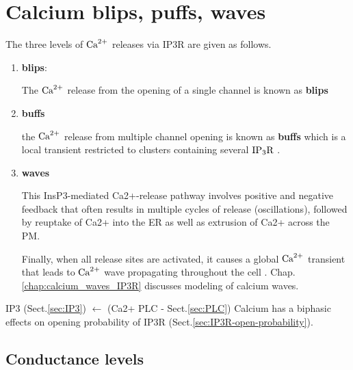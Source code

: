 


\section{Calcium blips, puffs, waves}
\label{sec:blips}
\label{sec:puff}
\label{sec:calcium-release-IP3R}

The three levels of ${\text{Ca}^{2+}}$ releases via IP3R are given as follows.
\begin{enumerate}
  
  \item {\bf blips}:

The ${\text{Ca}^{2+}}$ release from the opening of a single channel is known as {\bf blips}
\citep{parker1996eei}

  
  \item {\bf buffs}

the ${\text{Ca}^{2+}}$ release from multiple channel opening is
known as {\bf buffs} which is a local transient restricted to clusters
containing several ${\text{IP}_3\text{R}}$ \citep{parker1996cta, parker1996eei}. 
  
  \item {\bf waves}


This InsP3-mediated Ca2+-release pathway involves positive and negative feedback
that often results in multiple cycles of release (oscillations), followed by
reuptake of Ca2+ into the ER as well as extrusion of Ca2+ across the PM.

Finally, when all release sites are activated, it causes a global ${\text{Ca}^{2+}}$
transient that leads to ${\text{Ca}^{2+}}$ wave propagating throughout the cell
\citep{bootman1997cwc, callamaras1998}.
Chap.\ref{chap:calcium_waves_IP3R} discusses
modeling of calcium waves.

\end{enumerate}


IP3 (Sect.\ref{sec:IP3}) $\leftarrow$ (Ca2+ PLC - Sect.\ref{sec:PLC})
Calcium has a biphasic effects on opening probability of IP3R
(Sect.\ref{sec:IP3R-open-probability}).
% 
% 




\subsection{Conductance levels}
\label{sec:IP3R-conductance-level}


